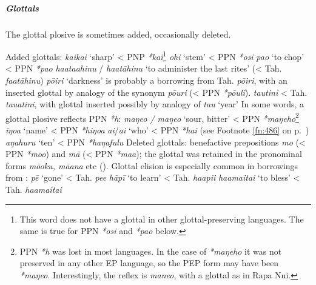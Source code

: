 \subparagraph{Glottals} The glottal plosive is sometimes added, occasionally deleted.

\ea
Added glottals: 
\ea
\textit{ka{\ꞌ}ika{\ꞌ}i} ‘sharp’ {\textless} PNP \textit{*kai}\footnote{\label{fn:64}This word does not have a glottal in other glottal-preserving languages. The same is true for PPN \textit{*osi} and \textit{*pao} below.} 
\ex
\textit{{\ꞌ}ohi} ‘stem’ {\textless} PPN \textit{*osi}
\ex
\textit{pa{\ꞌ}o} ‘to chop’ {\textless} PPN \textit{*pao}
\ex
\textit{ha{\ꞌ}ata{\ꞌ}ahinu} / \textit{ha{\ꞌ}atāhinu} ‘to administer the last rites’ ({\textless} Tah. \textit{fa{\ꞌ}atāhinu})
\ex
\textit{pō{\ꞌ}iri} ‘darkness’ is probably a borrowing from Tah. \textit{pōiri}, with an inserted glottal by analogy of the synonym \textit{pō{\ꞌ}uri} ({\textless} PPN \textit{*pō{\ꞌ}uli}).
\ex
\textit{ta{\ꞌ}utini} {\textless} Tah. \textit{tauatini}, with glottal inserted possibly by analogy of \textit{\mbox{ta{\ꞌ}u}} ‘year’
\z
\z
\ea
In some words, a glottal plosive reflects PPN \textit{*h}: 
\ea
\textit{maŋeo / maŋe{\ꞌ}o} ‘sour, bitter’ {\textless} PPN \textit{*maŋeho}\footnote{\label{fn:65}PPN \textit{*h} was lost in most languages. In the case of \textit{*maŋeho} it was not preserved in any other EP language, so the PEP form may have been \textit{*maŋeo}. Interestingly, the  reflex is \textit{mane{\ꞌ}o}, with a glottal as in Rapa Nui.}
\ex
\textit{{\ꞌ}īŋoa} ‘name’ {\textless} PPN \textit{*hiŋoa}
\ex
\textit{{\ꞌ}ai}/\textit{ai} ‘who’ {\textless} PPN \textit{*hai} (see Footnote \ref{fn:486} on p.~\pageref{fn:486})
\ex
\textit{{\ꞌ}aŋahuru} ‘ten’ {\textless} PPN \textit{*haŋafulu}
\z
\z
\ea
Deleted glottals: 
\ea
benefactive prepositions \textit{mo} ({\textless} PPN \textit{*mo{\ꞌ}o}) and \textit{mā} ({\textless} PPN \textit{*ma{\ꞌ}a}); the glottal was retained in the pronominal forms \textit{mō{\ꞌ}oku, mā{\ꞌ}ana} etc ().
\z
\z
\ea
Glottal elision is especially common in borrowings from : 
\ea
\textit{pē} ‘gone’ {\textless} Tah. \textit{pe{\ꞌ}e}
\ex
\textit{hāpī} ‘to learn’ {\textless} Tah. \textit{ha{\ꞌ}api{\ꞌ}i}
\ex
\textit{ha{\ꞌ}amaitai} ‘to bless’ {\textless} Tah. \textit{ha{\ꞌ}amaita{\ꞌ}i} 
\z
\z


